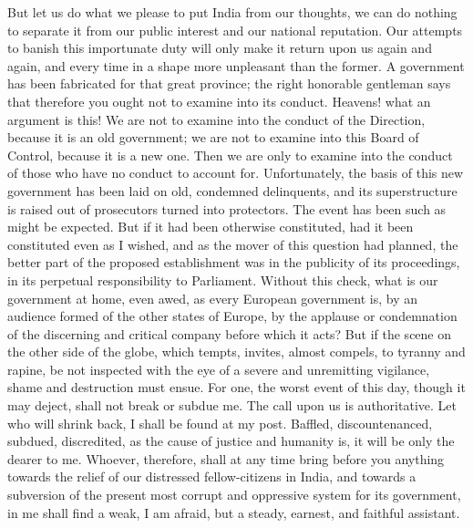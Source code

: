 But let us do what we please to put India from our thoughts, we can do nothing to separate it from our public interest and our national reputation. Our attempts to banish this importunate duty will only make it return upon us again and again, and every time in a shape more unpleasant than the former. A government has been fabricated for that great province; the right honorable gentleman says that therefore you ought not to examine into its conduct. Heavens! what an argument is this! We are not to examine into the conduct of the Direction, because it is an old government; we are not to examine into this Board of Control, because it is a new one. Then we are only to examine into the conduct of those who have no conduct to account for. Unfortunately, the basis of this new government has been laid on old, condemned delinquents, and its superstructure is raised out of prosecutors turned into protectors. The event has been such as might be expected. But if it had been otherwise constituted, had it been constituted even as I wished, and as the mover of this question had planned, the better part of the proposed establishment was in the publicity of its proceedings, in its perpetual responsibility to Parliament. Without this check, what is our government at home, even awed, as every European government is, by an audience formed of the other states of Europe, by the applause or condemnation of the discerning and critical company before which it acts? But if the scene on the other side of the globe, which tempts, invites, almost compels, to tyranny and rapine, be not inspected with the eye of a severe and unremitting vigilance, shame and destruction must ensue. For one, the worst event of this day, though it may deject, shall not break or subdue me. The call upon us is authoritative. Let who will shrink back, I shall be found at my post. Baffled, discountenanced, subdued, discredited, as the cause of justice and humanity is, it will be only the dearer to me. Whoever, therefore, shall at any time bring before you anything towards the relief of our distressed fellow-citizens in India, and towards a subversion of the present most corrupt and oppressive system for its government, in me shall find a weak, I am afraid, but a steady, earnest, and faithful assistant.






